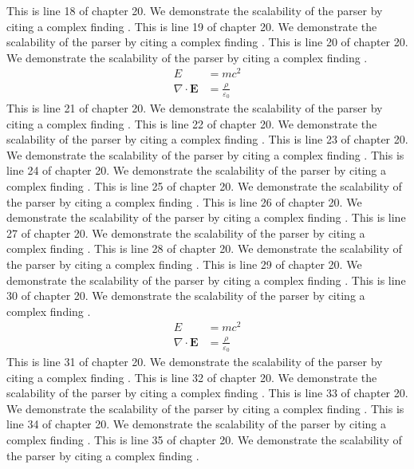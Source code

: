 This is line 18 of chapter 20. We demonstrate the scalability of the parser by citing a complex finding \cite{ref20_18}.
This is line 19 of chapter 20. We demonstrate the scalability of the parser by citing a complex finding \cite{ref20_19}.
This is line 20 of chapter 20. We demonstrate the scalability of the parser by citing a complex finding \cite{ref20_20}.
\begin{align*}
  E &= mc^2 \\
  \nabla \cdot \mathbf{E} &= \frac{\rho}{\varepsilon_0}
\end{align*}
This is line 21 of chapter 20. We demonstrate the scalability of the parser by citing a complex finding \cite{ref20_21}.
This is line 22 of chapter 20. We demonstrate the scalability of the parser by citing a complex finding \cite{ref20_22}.
This is line 23 of chapter 20. We demonstrate the scalability of the parser by citing a complex finding \cite{ref20_23}.
This is line 24 of chapter 20. We demonstrate the scalability of the parser by citing a complex finding \cite{ref20_24}.
This is line 25 of chapter 20. We demonstrate the scalability of the parser by citing a complex finding \cite{ref20_25}.
This is line 26 of chapter 20. We demonstrate the scalability of the parser by citing a complex finding \cite{ref20_26}.
This is line 27 of chapter 20. We demonstrate the scalability of the parser by citing a complex finding \cite{ref20_27}.
This is line 28 of chapter 20. We demonstrate the scalability of the parser by citing a complex finding \cite{ref20_28}.
This is line 29 of chapter 20. We demonstrate the scalability of the parser by citing a complex finding \cite{ref20_29}.
This is line 30 of chapter 20. We demonstrate the scalability of the parser by citing a complex finding \cite{ref20_30}.
\begin{align*}
  E &= mc^2 \\
  \nabla \cdot \mathbf{E} &= \frac{\rho}{\varepsilon_0}
\end{align*}
This is line 31 of chapter 20. We demonstrate the scalability of the parser by citing a complex finding \cite{ref20_31}.
This is line 32 of chapter 20. We demonstrate the scalability of the parser by citing a complex finding \cite{ref20_32}.
This is line 33 of chapter 20. We demonstrate the scalability of the parser by citing a complex finding \cite{ref20_33}.
This is line 34 of chapter 20. We demonstrate the scalability of the parser by citing a complex finding \cite{ref20_34}.
This is line 35 of chapter 20. We demonstrate the scalability of the parser by citing a complex finding \cite{ref20_35}.
